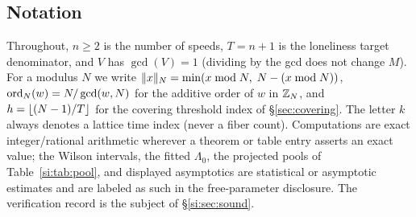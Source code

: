 \subsection{Notation}

Throughout, $n\ge 2$ is the number of speeds, $T=n+1$ is the loneliness
target denominator, and $V$ has $\gcd(V)=1$ (dividing by the gcd does
not change $M$). For a modulus $N$ we write $\lVert x \rVert_{N}=\min(x\bmod N,\;
N-(x\bmod N))$, $\operatorname{ord}_N(w)=N/\gcd(w,N)$ for the additive order of $w$
in $\mathbb{Z}_N$, and $h=\left\lfloor (N-1)/T \right\rfloor$ for the covering threshold index
of \S\ref{sec:covering}. The letter $k$ always denotes a lattice time
index (never a fiber count). Computations are exact integer/rational
arithmetic wherever a theorem or table entry asserts an exact value; the
Wilson intervals, the fitted $\Lambda_0$, the projected pools of
Table~\ref{si:tab:pool}, and displayed asymptotics are statistical or
asymptotic estimates and are labeled as such in the free-parameter
disclosure. The verification record is the subject of
\S\ref{si:sec:sound}.

